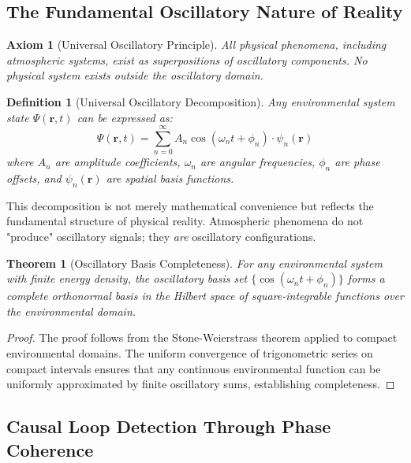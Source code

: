 \documentclass[12pt,a4paper]{article}
\newtheorem{theorem}{Theorem}
\newtheorem{definition}{Definition}
\newtheorem{axiom}{Axiom}
\begin{document}
\subsection{The Fundamental Oscillatory Nature of Reality}

\begin{axiom}[Universal Oscillatory Principle]
All physical phenomena, including atmospheric systems, exist as superpositions of oscillatory components. No physical system exists outside the oscillatory domain.
\end{axiom}

\begin{definition}[Universal Oscillatory Decomposition]
Any environmental system state $\Psi(\mathbf{r}, t)$ can be expressed as:
\begin{equation}
\Psi(\mathbf{r}, t) = \sum_{n=0}^{\infty} A_n \cos(\omega_n t + \phi_n) \cdot \psi_n(\mathbf{r})
\end{equation}
where $A_n$ are amplitude coefficients, $\omega_n$ are angular frequencies, $\phi_n$ are phase offsets, and $\psi_n(\mathbf{r})$ are spatial basis functions.
\end{definition}

This decomposition is not merely mathematical convenience but reflects the fundamental structure of physical reality. Atmospheric phenomena do not "produce" oscillatory signals; they \textit{are} oscillatory configurations.

\begin{theorem}[Oscillatory Basis Completeness]
For any environmental system with finite energy density, the oscillatory basis set $\{\cos(\omega_n t + \phi_n)\}$ forms a complete orthonormal basis in the Hilbert space of square-integrable functions over the environmental domain.
\end{theorem}

\begin{proof}
The proof follows from the Stone-Weierstrass theorem applied to compact environmental domains. The uniform convergence of trigonometric series on compact intervals ensures that any continuous environmental function can be uniformly approximated by finite oscillatory sums, establishing completeness.
\end{proof}

\subsection{Causal Loop Detection Through Phase Coherence}
\end{document}

